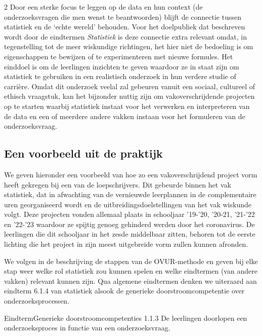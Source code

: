 \begin{multicols}{2}
Door een sterke focus te leggen op de data en hun context (de onderzoeksvragen die men wenst te beantwoorden) blijft de connectie tussen statistiek en de `echte wereld' behouden. 
Voor het doelpubliek dat beschreven wordt door de eindtermen \emph{Statistiek} is deze connectie extra relevant omdat, in tegenstelling tot de meer wiskundige richtingen, het hier niet de bedoeling is om eigenschappen te bewijzen of te experimenteren met nieuwe formules. Het einddoel is om de leerlingen inzichten te geven waardoor ze in staat zijn om statistiek te gebruiken in een realistisch onderzoek in hun verdere studie of carri\`ere. Omdat dit onderzoek veelal zal gebeuren vanuit een sociaal, cultureel of ethisch vraagstuk, kan het bijzonder nuttig zijn om vakoverschrijdende projecten op te starten waarbij statistiek instaat voor het verwerken en interpreteren van de data en een of meerdere andere vakken instaan voor het formuleren van de onderzoeksvraag.

\subsection*{Een voorbeeld uit de praktijk}
We geven hieronder een voorbeeld van hoe zo een vakoverschrijdend project vorm heeft gekregen bij een van de loepschrijvers. Dit gebeurde binnen het vak statistiek, dat in afwachting van de vernieuwde leerplannen in de complementaire uren georganiseerd wordt en de uitbreidingsdoelstellingen van het vak wiskunde volgt. Deze projecten vonden allemaal plaats in schooljaar '19-'20, '20-21, '21-'22 en '22-'23 waardoor ze spijtig genoeg gehinderd werden door het coronavirus. De leerlingen die dit schooljaar in het zesde middelbaar zitten, behoren tot de eerste lichting die het project in zijn meest uitgebreide vorm zullen kunnen afronden. 

We volgen in de beschrijving de stappen van de OVUR-methode en geven bij elke stap weer welke rol statistiek zou kunnen spelen en welke eindtermen (van andere vakken) relevant kunnen zijn. Qua algemene eindtermen denken we uiteraard aan eindterm 6.1.4 van statistiek alsook de generieke doorstroomcompetentie over onderzoeksprocessen.

        
    \begin{kader}{Eindterm}{Generieke doorstroomcompetenties}
             1.1.3 De leerlingen doorlopen een onderzoeksproces in functie van een onderzoeksvraag.
    \end{kader}


\end{multicols}
